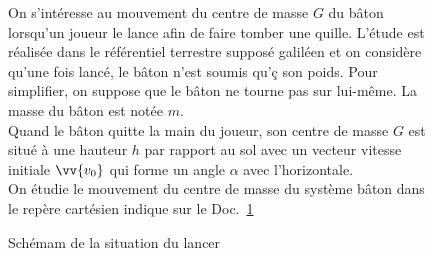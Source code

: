 \documentclass[a4paper,11pt,fleqn]{scrartcl}%
\begin{document}
\begin{figure}[h!]
\begin{minipage}{.6\linewidth}
    On s'intéresse au mouvement du centre de masse $G$ du bâton lorsqu'un joueur le lance afin de faire tomber une quille. L'étude est réalisée dans le référentiel terrestre supposé galiléen et on considère qu'une fois lancé, le bâton n'est soumis qu'ç son poids. Pour simplifier, on suppose que le bâton ne tourne pas sur lui-même. La masse du bâton est notée $m$.\\
    Quand le bâton quitte la main du joueur, son centre de masse $G$ est situé à une hauteur $h$ par rapport au sol avec un vecteur vitesse initiale $\vv{v_0}$ qui forme un angle $\alpha$ avec l'horizontale.\\
    On étudie le mouvement du centre de masse du système {bâton} dans le repère cartésien indique sur le Doc.~\ref{doc1}    
\end{minipage}
\begin{minipage}{.38\linewidth}
    \caption{Schémam de la situation du lancer}
    \label{doc1}
    \centering
\end{minipage}
\end{figure}
\end{document}
